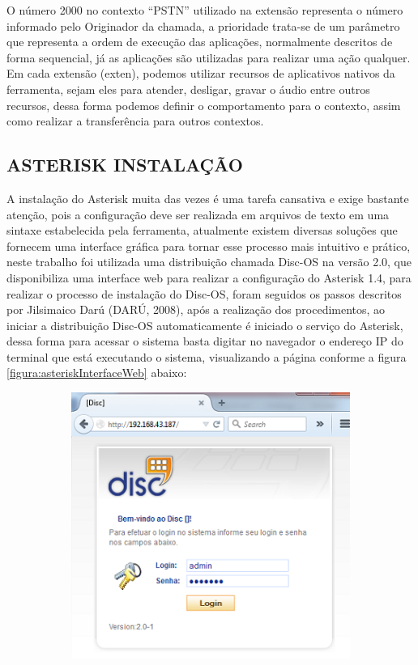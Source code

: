 O número 2000 no contexto “PSTN” utilizado na extensão representa o número informado pelo Originador da chamada, a prioridade trata-se de um parâmetro que representa a ordem de execução das aplicações, normalmente descritos de forma sequencial, já as aplicações são utilizadas para realizar uma ação qualquer. Em cada extensão (exten), podemos utilizar recursos de aplicativos nativos da ferramenta, sejam eles para atender, desligar, gravar o áudio entre outros recursos, dessa forma podemos definir o comportamento para o contexto, assim como realizar a transferência para outros contextos.


\subsection{\textbf{\uppercase{Asterisk Instalação}}}

A instalação do Asterisk muita das vezes é uma tarefa cansativa e exige bastante atenção, pois a configuração deve ser realizada em arquivos de texto em uma sintaxe estabelecida pela ferramenta, atualmente existem diversas soluções que fornecem uma interface gráfica para tornar esse processo mais intuitivo e prático, neste trabalho foi utilizada uma distribuição chamada Disc-OS na versão 2.0, que disponibiliza uma interface web para realizar a configuração do Asterisk 1.4, para realizar o processo de instalação do Disc-OS, foram seguidos os passos descritos por Jilsimaico Darú (DARÚ, 2008), após a realização dos procedimentos, ao iniciar a distribuição Disc-OS automaticamente é iniciado o serviço do Asterisk, dessa forma para acessar o sistema basta digitar no navegador o endereço IP do terminal que está executando o sistema, visualizando a página conforme a figura \ref{figura:asteriskInterfaceWeb} abaixo:


\begin{figure}[H]
	\centering
	\caption{Acessando página inicial da Interface WEB do Disc-OS}	
	\label{figura:asteriskInterfaceWeb}
	\begin{subfigure}[H]{\textwidth}
		\centering
		\includegraphics{figuras/pagina_inicial_asterisk.png}
	\end{subfigure}
\end{figure}


